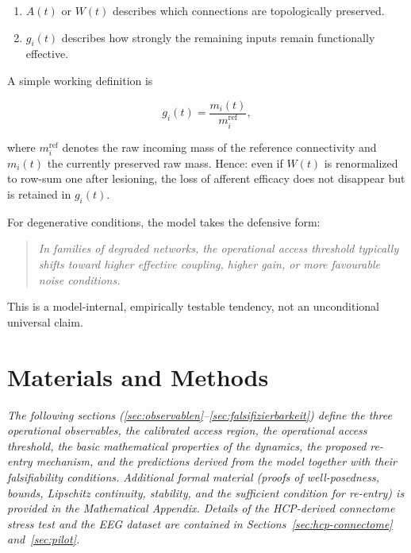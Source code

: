\documentclass[11pt,a4paper]{article}
\theoremstyle{plain}
\theoremstyle{definition}
\theoremstyle{remark}
\begin{document}
\begin{enumerate}
  \item $A(t)$ or $W(t)$ describes which connections are topologically preserved.
  \item $g_i(t)$ describes how strongly the remaining inputs remain functionally effective.
\end{enumerate}

A simple working definition is

\begin{equation}
\label{eq:gain}
g_i(t) = \frac{m_i(t)}{m_i^{\mathrm{ref}}},
\end{equation}

where $m_i^{\mathrm{ref}}$ denotes the raw incoming mass of the reference connectivity and $m_i(t)$ the currently preserved raw mass. Hence: even if $W(t)$ is renormalized to row-sum one after lesioning, the loss of afferent efficacy does not disappear but is retained in $g_i(t)$.

For degenerative conditions, the model takes the defensive form:

\begin{quote}
\itshape
In families of degraded networks, the operational access threshold typically shifts toward higher effective coupling, higher gain, or more favourable noise conditions.
\end{quote}

This is a model-internal, empirically testable tendency, not an unconditional universal claim.


\section*{Materials and Methods}

\noindent\textit{The following sections (\ref{sec:observablen}--\ref{sec:falsifizierbarkeit}) define the three operational observables, the calibrated access region, the operational access threshold, the basic mathematical properties of the dynamics, the proposed re-entry mechanism, and the predictions derived from the model together with their falsifiability conditions. Additional formal material (proofs of well-posedness, bounds, Lipschitz continuity, stability, and the sufficient condition for re-entry) is provided in the Mathematical Appendix. Details of the HCP-derived connectome stress test and the EEG dataset are contained in Sections~\ref{sec:hcp-connectome} and~\ref{sec:pilot}.}
\end{document}
